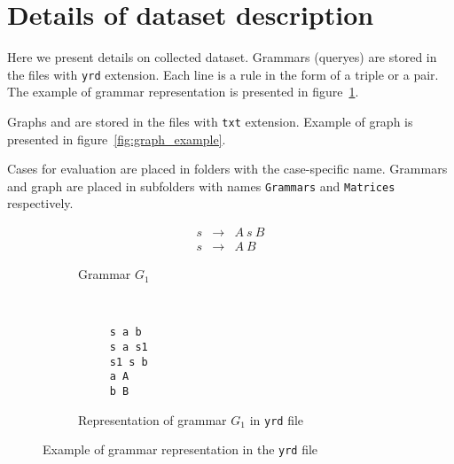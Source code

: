 \section{Details of dataset description}

Here we present details on collected dataset.
Grammars (queryes) are stored in the files with \verb|yrd| extension.
Each line is a rule in the form of a triple or a pair.
The example of grammar representation is presented in figure~\ref{fig:grammar_example}.

Graphs and are stored in the files with \verb|txt| extension.
Example of graph is presented in figure~\ref{fig:graph_example}.

Cases for evaluation are placed in folders with the case-specific name.
Grammars and graph are placed in subfolders with names \verb|Grammars| and \verb|Matrices| respectively.

\begin{figure}[h]
    \centering
    \begin{subfigure}[b]{0.24\textwidth}
        \centering
        \[
         \begin{array}{rcl}
           s & \rightarrow & A \ s \ B \\
           s & \rightarrow & A \ B
         \end{array}
         \]
        \caption{Grammar $G_1$}
    \end{subfigure}%
    ~
    \begin{subfigure}[b]{0.24\textwidth}
        \centering
        \begin{verbatim}
     s a b
     s a s1
     s1 s b
     a A
     b B
        \end{verbatim}
        \caption{Representation of grammar $G_1$ in \texttt{yrd} file}
    \end{subfigure}
    \caption{Example of grammar representation in the \texttt{yrd} file}
    \label{fig:grammar_example}
\end{figure}


